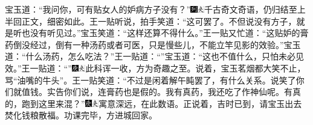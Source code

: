 宝玉道：``我问你，可有贴女人的妒病方子没有？''{\includegraphics[width=3mm]{../Images/00007}\includegraphics[width=3mm]{../Images/00012}\footnotesize \kaishu 千古奇文奇语，仍归结至上半回正文，细密如此。}王一贴听说，拍手笑道：``这可罢了。不但说没有方子，就是听也没有听见过。''宝玉笑道：``这样还算不得什么。''王一贴又忙道：``这贴妒的膏药倒没经过，倒有一种汤药或者可医，只是慢些儿，不能立竿见影的效验。''宝玉道：``什么汤药，怎么吃法？''王一贴道：``''宝玉道：``这也不值什么，只怕未必见效。''王一贴道：``''{\includegraphics[width=3mm]{../Images/00004}\includegraphics[width=3mm]{../Images/00012}\footnotesize \kaishu 此科诨一收，方为奇趣之至。}说着，宝玉茗烟都大笑不止，骂``油嘴的牛头''。王一贴笑道：``不过是闲着解午盹罢了，有什么关系。说笑了你们就值钱。实告你们说，连膏药也是假的。我有真药，我还吃了作神仙呢。有真的，跑到这里来混？''{\includegraphics[width=3mm]{../Images/00004}\includegraphics[width=3mm]{../Images/00012}\footnotesize \kaishu 寓意深远，在此数语。}正说着，吉时已到，请宝玉出去焚化钱粮散福。功课完毕，方进城回家。

